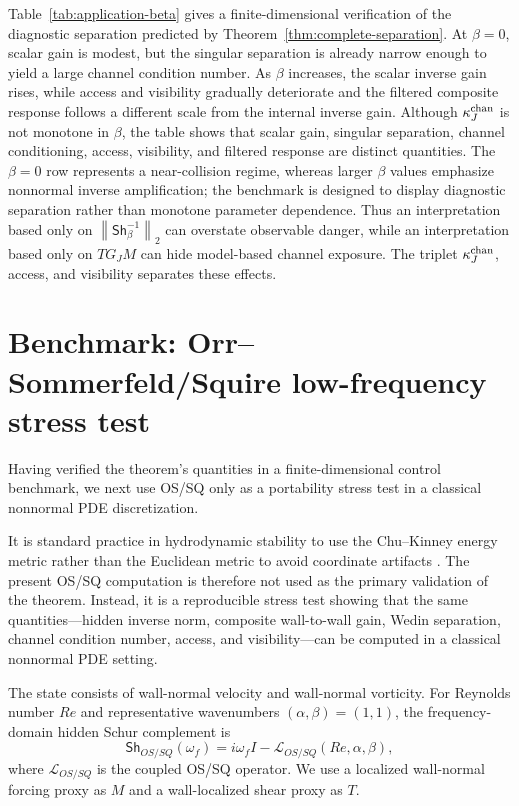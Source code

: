 \documentclass[review]{siamart220329}
\theoremstyle{definition}
\theoremstyle{remark}
\newcommand{\Sh}{\mathsf{Sh}}
\newcommand{\norm}[1]{\left\lVert #1\right\rVert}
\begin{document}
Table~\ref{tab:application-beta} gives a finite-dimensional verification of the
diagnostic separation predicted by Theorem~\ref{thm:complete-separation}. At $\beta=0$,
scalar gain is modest, but the singular separation is already narrow enough to
yield a large channel condition number. As $\beta$ increases, the scalar inverse
gain rises, while access and visibility gradually deteriorate and the filtered
composite response follows a different scale from the internal inverse gain.
Although $\kappa_J^{\rm chan}$ is not monotone in $\beta$, the table shows that
scalar gain, singular separation, channel conditioning, access, visibility, and
filtered response are distinct quantities. The $\beta=0$ row represents a near-collision regime, whereas larger $\beta$ values emphasize nonnormal inverse amplification; the benchmark is designed to display diagnostic separation rather than monotone parameter dependence. Thus an interpretation based only on
$\norm{\Sh_\beta^{-1}}_2$ can overstate observable danger, while an
interpretation based only on $TG_JM$ can hide model-based channel exposure. The
triplet $\kappa_J^{\rm chan}$, access, and visibility separates these effects.

\section{Benchmark: Orr--Sommerfeld/Squire low-frequency stress test}\label{sec:orr-sommerfeld}

Having verified the theorem's quantities in a finite-dimensional control benchmark, we next use OS/SQ only as a portability stress test in a classical nonnormal PDE discretization.

It is standard practice in hydrodynamic stability to use the Chu--Kinney
energy metric rather than the Euclidean metric to avoid coordinate artifacts
\cite{SchmidHenningson2001}. The present OS/SQ computation is therefore not
used as the primary validation of the theorem. Instead, it is a reproducible
stress test showing that the same quantities---hidden inverse norm, composite
wall-to-wall gain, Wedin separation, channel condition number, access, and
visibility---can be computed in a classical nonnormal PDE setting.

The state consists of wall-normal velocity and wall-normal vorticity. For
Reynolds number $Re$ and representative wavenumbers $(\alpha,\beta)=(1,1)$, the
frequency-domain hidden Schur complement is
\begin{equation}
    \Sh_{OS/SQ}(\omega_f)=i\omega_f I-\mathcal L_{OS/SQ}(Re,\alpha,\beta),
    \label{eq:orr-sommerfeld-schur}
\end{equation}
where $\mathcal L_{OS/SQ}$ is the coupled OS/SQ operator. We use a localized
wall-normal forcing proxy as $M$ and a wall-localized shear proxy as $T$.
\end{document}

